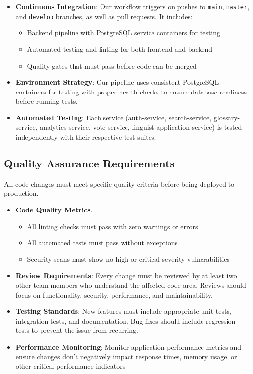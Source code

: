 \documentclass[12pt]{article}
\begin{document}
\begin{itemize}
    \item \textbf{Continuous Integration}: Our workflow triggers on pushes to \texttt{main}, \texttt{master}, and \texttt{develop} branches, as well as pull requests. It includes:
    \begin{itemize}
        \item Backend pipeline with PostgreSQL service containers for testing
        \item Automated testing and linting for both frontend and backend
        \item Quality gates that must pass before code can be merged
    \end{itemize}
    
    \item \textbf{Environment Strategy}: Our pipeline uses consistent PostgreSQL containers for testing with proper health checks to ensure database readiness before running tests.
    
    \item \textbf{Automated Testing}: Each service (auth-service, search-service, glossary-service, analytics-service, vote-service, linguist-application-service) is tested independently with their respective test suites.
\end{itemize}

\subsection{Quality Assurance Requirements}
All code changes must meet specific quality criteria before being deployed to production.

\begin{itemize}
    \item \textbf{Code Quality Metrics}: 
    \begin{itemize}
        \item All linting checks must pass with zero warnings or errors
        \item All automated tests must pass without exceptions
        \item Security scans must show no high or critical severity vulnerabilities
    \end{itemize}
    
    \item \textbf{Review Requirements}: Every change must be reviewed by at least two other team members who understand the affected code area. Reviews should focus on functionality, security, performance, and maintainability.
    
    \item \textbf{Testing Standards}: New features must include appropriate unit tests, integration tests, and documentation. Bug fixes should include regression tests to prevent the issue from recurring.
    
    \item \textbf{Performance Monitoring}: Monitor application performance metrics and ensure changes don't negatively impact response times, memory usage, or other critical performance indicators.
\end{itemize}
\end{document}
